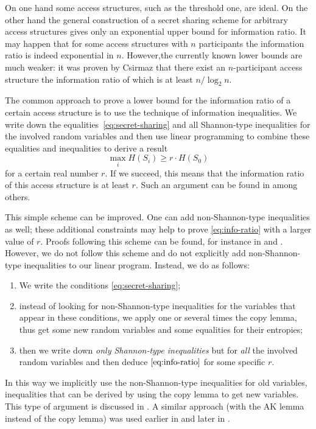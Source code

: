 \documentclass[11pt, a4paper]{kybernetika}
\begin{document}
	On one hand some access structures, such as the threshold one, are ideal. On the other hand the general construction of a secret sharing scheme for arbitrary access structures gives only an exponential upper bound for information ratio. It may happen that for some access structures with $n$ participants the information ratio is indeed exponential in $n$. However,the currently known lower bounds are much weaker: 
	it was proven by Csirmaz \cite{csirmaz1997size} that there exist an $n$-participant access structure the information ratio of which is at least $n/\log_2n$.
	
	The common approach to prove a lower bound for the information ratio of a certain access structure is to use the technique of information inequalities. We write down the equalities~\eqref{eq:secret-sharing} and all Shannon-type inequalities for the involved random variables and then use linear programming to combine these equalities and inequalities to derive a result
	\begin{equation} \label{eq:info-ratio}
		\max_iH(S_i)\ge r\cdot H(S_0)
	\end{equation}
	for a certain real number $r$. If we succeed, this means that the information ratio of this access structure is at least $r$. Such an argument can be found in \cite{capocelli1993size} among others.
	
	This simple scheme can be improved. One can add non-Shannon-type inequalities as well; these additional constraints may help to prove \eqref{eq:info-ratio} with a larger value of $r$. Proofs following this scheme can be found, for instance in \cite{beimel2008matroids} and \cite{metcalf2011improved}. However, we do not follow this scheme and do not explicitly add non-Shannon-type inequalities to our linear program. Instead, we do as follows:
	
	\begin{enumerate}
		\item We write the conditions \eqref{eq:secret-sharing};
		\item instead of looking for non-Shannon-type inequalities for the variables that appear in these conditions, we apply one or several times the copy lemma, thus get some new random variables and some equalities for their entropies;
		\item then we write down \emph{only Shannon-type inequalities} but for \emph{all} the involved random variables and then deduce $\eqref{eq:info-ratio}$ for some specific $r$. 
	\end{enumerate}
	In this way we implicitly use the non-Shannon-type inequalities for old variables, inequalities that can be derived by using the copy lemma to get new variables.	
	This type of argument is discussed in \cite{gurpinar2019use}. A similar approach (with the AK lemma instead of the copy lemma) was used earlier in \cite{farras2018improving} and later in \cite{bamiloshin2021common}.
	
\end{document}
